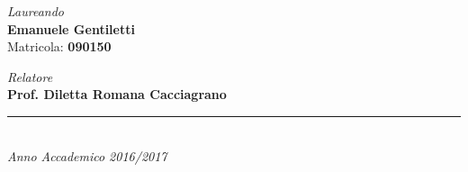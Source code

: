 \begin{titlepage}
\begin{minipage}[t]{0.47\textwidth}
    \begin{center}
    {\LARGE{\textsl{Laureando}
    \vspace{0.2cm}\\
    \textbf{Emanuele Gentiletti}\\
    \vspace{1.7cm}
    Matricola: \textbf{090150}
    }}

    \end{center}
\end{minipage}
\hfill
\begin{minipage}[t]{0.47\textwidth}
    \begin{center}
    {\LARGE{\textsl{Relatore}
    \vspace{0.2cm}\\
    \bf Prof. Diletta Romana Cacciagrano\\
    }}

    \end{center}
\end{minipage}
\vspace{35mm}
\begin{center}
\rule[0.1cm]{14cm}{0.1mm}\\
\vspace{2mm}
{\Large{\textsl{Anno Accademico 2016/2017}}}
\end{center}
\end{titlepage}
\restoregeometry
\clearpage
\cleardoublepage

